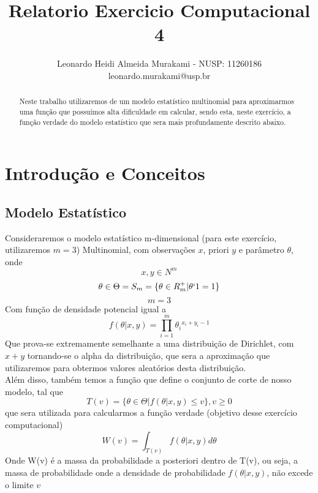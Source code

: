 \documentclass[twocolumn,amsmath,amssymb,floatfix]{revtex4}
\begin{document}

\title{Relatorio Exercicio Computacional 4}

\author{Leonardo Heidi Almeida Murakami - NUSP: 11260186 \\\small leonardo.murakami@usp.br} 

\begin{abstract}
\baselineskip 11pt
Neste trabalho utilizaremos de um modelo estatístico multinomial para aproximarmos uma função que possuímos alta dificuldade em calcular, sendo esta, neste exercício, a função verdade do modelo estatístico que sera mais profundamente descrito abaixo.
\end{abstract}

\maketitle
\section{Introdução e Conceitos}
\subsection{Modelo Estatístico}
\indent Consideraremos o modelo estatístico m-dimensional (para este exercício, utilizaremos $m=3$) Multinomial, com observações $x$, priori $y$ e parâmetro $\theta$, onde
\begin{equation}
    x, y \in N^{m}
\end{equation}
\begin{equation}
    \theta \in \Theta = S_m = \{\theta \in R^+_m | \theta`1 = 1\}
\end{equation}
\begin{equation}
    m=3
\end{equation}
Com função de densidade potencial igual a
\begin{equation}
    f(\theta | x,y) = \prod_{i=1}^m \theta{_i}^{x_i + y_i - 1}
\end{equation}
\indent Que prova-se extremamente semelhante a uma distribuição de Dirichlet, com $x + y$ tornando-se o alpha da distribuição, que sera a aproximação que utilizaremos para obtermos valores aleatórios desta distribuição. \\
\indent Além disso, também temos a função que define o conjunto de corte de nosso modelo, tal que
\begin{equation}
    T(v) = \{\theta \in \Theta | f(\theta | x,y) \leq v\}, v \geq 0
\end{equation}
que sera utilizada para calcularmos a função verdade (objetivo desse exercício computacional)
\begin{equation}
    W(v) = \int_{T(v)}f(\theta | x, y)d\theta
\end{equation}
\indent Onde W(v) é a massa da probabilidade a posteriori dentro de T(v), ou seja, a massa de probabilidade onde a densidade de probabilidade $f(\theta | x,y)$, não excede o limite $v$
\end{document}
